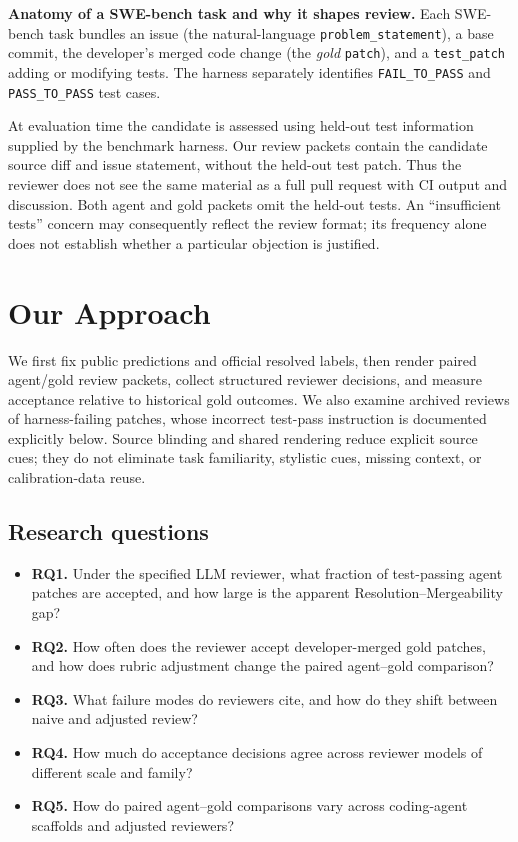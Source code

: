 \documentclass[10pt,conference]{IEEEtran}
\begin{document}
\textbf{Anatomy of a SWE-bench task and why it shapes review.} Each SWE-bench task bundles an
issue (the natural-language \texttt{problem\_statement}), a base commit, the developer's merged
code change (the \emph{gold} \texttt{patch}), and a \texttt{test\_patch} adding or modifying tests. The harness separately
identifies \texttt{FAIL\_TO\_PASS} and \texttt{PASS\_TO\_PASS} test cases.

At evaluation time the candidate is assessed using held-out test information supplied by
the benchmark harness. Our review packets contain the candidate source diff and issue
statement, without the held-out test patch. Thus the reviewer does not see the same material
as a full pull request with CI output and discussion. Both agent and gold packets omit the
held-out tests. An ``insufficient tests'' concern may consequently reflect the review format;
its frequency alone does not establish whether a particular objection is justified.

\section{Our Approach}
\label{sec:design}

We first fix public predictions and official resolved labels, then render paired agent/gold
review packets, collect structured reviewer decisions, and measure acceptance relative to
historical gold outcomes. We also examine archived reviews of harness-failing patches,
whose incorrect test-pass instruction is documented explicitly below. Source blinding and
shared rendering reduce explicit source cues; they do not eliminate task familiarity,
stylistic cues, missing context, or calibration-data reuse.

\subsection{Research questions}
\begin{itemize}
\item \textbf{RQ1.} Under the specified LLM reviewer, what fraction of test-passing agent
patches are accepted, and how large is the apparent Resolution--Mergeability gap?
\item \textbf{RQ2.} How often does the reviewer accept developer-merged gold patches, and how does rubric adjustment change the paired agent--gold comparison?
\item \textbf{RQ3.} What failure modes do reviewers cite, and how do they shift between naive and
adjusted review?
\item \textbf{RQ4.} How much do acceptance decisions agree across reviewer models of
different scale and family?
\item \textbf{RQ5.} How do paired agent--gold comparisons vary across coding-agent scaffolds and adjusted reviewers?
\end{itemize}
\end{document}
